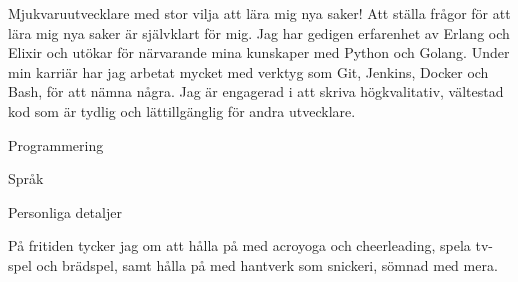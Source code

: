 \documentclass[purpleprocv]{procv}
\begin{document}
    \begin{procv-twocolumns}
        {Mjukvaruutvecklare med stor vilja att lära mig nya saker! Att 
        ställa frågor för att lära mig nya saker är självklart för mig. 
        Jag har gedigen erfarenhet av Erlang och Elixir och utökar för 
        närvarande mina kunskaper med Python och Golang. Under min karriär 
        har jag arbetat mycket med verktyg som Git, Jenkins, Docker och Bash, 
        för att nämna några. Jag är engagerad i att skriva högkvalitativ, 
        vältestad kod som är tydlig och lättillgänglig 
        för andra utvecklare.}
        \begin{skills}{Programmering}
        \end{skills}
        \begin{skills}{Språk}
        \end{skills}
        \begin{personal}{Personliga detaljer}
        \end{personal}
        {På fritiden tycker jag om att hålla på med acroyoga och 
        cheerleading, spela tv-spel och brädspel, samt hålla på med
        hantverk som snickeri, sömnad med mera.}
        \switchcolumn %
\end{procv-twocolumns}
\end{document}
